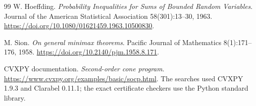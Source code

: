 \documentclass[11pt,a4paper]{article}
\theoremstyle{definition}
\theoremstyle{remark}
\newcommand{\1}{\mathbf 1}
\begin{document}
\begin{thebibliography}{99}
W. Hoeffding. \emph{Probability Inequalities for Sums of Bounded Random
Variables}. Journal of the American Statistical Association 58(301):13--30,
1963. \url{https://doi.org/10.1080/01621459.1963.10500830}.

M. Sion. \emph{On general minimax theorems}.
Pacific Journal of Mathematics 8(1):171--176, 1958.
\url{https://doi.org/10.2140/pjm.1958.8.171}.

CVXPY documentation. \emph{Second-order cone program}.
\url{https://www.cvxpy.org/examples/basic/socp.html}.
The searches used CVXPY 1.9.3 and Clarabel 0.11.1;
the exact certificate checkers use the Python standard library.
\end{thebibliography}
\end{document}
